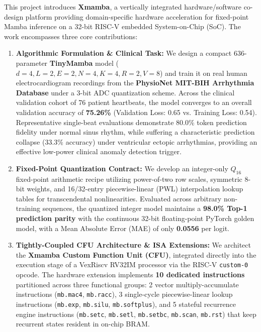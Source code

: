 \documentclass[11pt,a4paper,oneside]{report}
\begin{document}
This project introduces \textbf{Xmamba}, a vertically integrated hardware/software co-design platform providing domain-specific hardware acceleration for fixed-point Mamba inference on a 32-bit RISC-V embedded System-on-Chip (SoC). The work encompasses three core contributions:
\begin{enumerate}
    \item \textbf{Algorithmic Formulation \& Clinical Task:} We design a compact 636-parameter \textbf{TinyMamba} model ($d=4, L=2, E=2, N=4, K=4, R=2, V=8$) and train it on real human electrocardiogram recordings from the \textbf{PhysioNet MIT-BIH Arrhythmia Database} under a 3-bit ADC quantization scheme. Across the clinical validation cohort of 76 patient heartbeats, the model converges to an overall validation accuracy of \textbf{75.26\%} (Validation Loss: 0.65 vs. Training Loss: 0.54). Representative single-beat evaluations demonstrate 80.0\% token prediction fidelity under normal sinus rhythm, while suffering a characteristic prediction collapse (33.3\% accuracy) under ventricular ectopic arrhythmias, providing an effective low-power clinical anomaly detection trigger.
    \item \textbf{Fixed-Point Quantization Contract:} We develop an integer-only $Q_{16}$ fixed-point arithmetic recipe utilizing power-of-two row scales, symmetric 8-bit weights, and 16/32-entry piecewise-linear (PWL) interpolation lookup tables for transcendental nonlinearities. Evaluated across arbitrary non-training sequences, the quantized integer model maintains a \textbf{98.0\% Top-1 prediction parity} with the continuous 32-bit floating-point PyTorch golden model, with a Mean Absolute Error (MAE) of only \textbf{0.0556} per logit.
    \item \textbf{Tightly-Coupled CFU Architecture \& ISA Extensions:} We architect the \textbf{Xmamba Custom Function Unit (CFU)}, integrated directly into the execution stage of a VexRiscv RV32IM processor via the RISC-V \texttt{custom-0} opcode. The hardware extension implements \textbf{10 dedicated instructions} partitioned across three functional groups: 2 vector multiply-accumulate instructions (\texttt{mb.mac4}, \texttt{mb.racc}), 3 single-cycle piecewise-linear lookup instructions (\texttt{mb.exp}, \texttt{mb.silu}, \texttt{mb.softplus}), and 5 stateful recurrence engine instructions (\texttt{mb.setc}, \texttt{mb.setl}, \texttt{mb.setbc}, \texttt{mb.scan}, \texttt{mb.rst}) that keep recurrent states resident in on-chip BRAM.
\end{enumerate}
\end{document}

